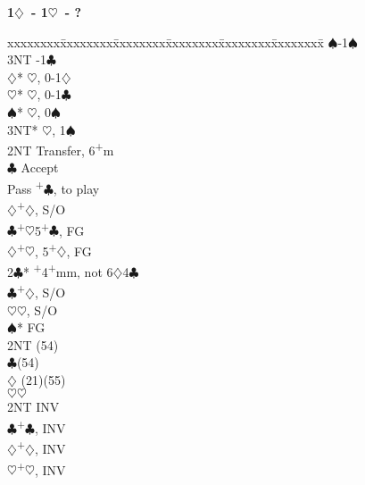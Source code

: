 \documentclass[10pt]{article}
\renewcommand{\c}{$\clubsuit$}
\renewcommand{\d}{$\diamondsuit$}
\newcommand{\h}{$\heartsuit$}
\newcommand{\s}{$\spadesuit$}
\newcommand{\p}{\textsuperscript{+}}
\newenvironment{bidtable}[1][]
{\textbf{#1}
  \begin{adjustwidth}{1em}{}
    \addvspace{2pt}
    \begin{tabbing}
      xxxxxxxx\=xxxxxxxx\=xxxxxxxx\=xxxxxxxx\=xxxxxxxx\=xxxxxxxx\=\kill}
{\end{tabbing}\end{adjustwidth}\bigskip}%
\begin{document}
\begin{multicols*}{2}
\begin{bidtable}[1\d\ - 1\h\ - ?]
                \>      \>          \>      \>     \s {}-1\s \\
                \>      \>          \>      \>     \> 3NT -1\c \\
                \>      \>          \d* {}\h, 0-1\d          \\
                \>      \>          \h* {}\h, 0-1\c          \\
                \>      \>          \s* {}\h, 0\s            \\
                \>      \>          \> 3NT* \h, 1\s            \\
                \> 2NT  \> Transfer, 6\p m                         \\
                \>      \c      \> Accept                      \\
                \>      \>          \> Pass \p\c, to play      \\
                \>      \>          \d  {}\p\d, S/O          \\
                \c  {}\p\h 5\p\c, FG                         \\
                \d  {}\p\h, 5\p\d, FG                        \\
2\c*            {}\p 4\p mm, not 6\d 4\c                         \\
                \c  {}\p\d, S/O                              \\
                \h  {}\h, S/O                                \\
                \s* \> FG                                      \\
                \>      \> 2NT      (54)                      \\
                \>      \c      {}(54)                      \\
                \>      \d      \> (21)(55)                    \\
                \>      \h      {}\h                         \\
                \> 2NT  \> INV                                     \\
                \c  {}\p\c, INV                              \\
                \d  {}\p\d, INV                              \\
                \h  {}\p\h, INV                              \\

\end{bidtable}
\end{multicols*}
\end{document}
